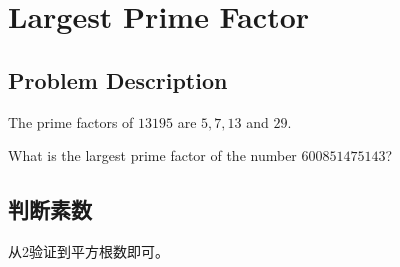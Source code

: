 \chapter{Largest Prime Factor}
\section{Problem Description}
\begin{tcolorbox}
The prime factors of $13195$ are $5, 7, 13$ and $29$.

What is the largest prime factor of the number $600851475143$?
\end{tcolorbox}

\section{判断素数}
从2验证到平方根数即可。
